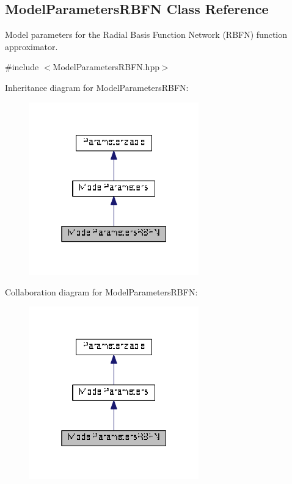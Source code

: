 \hypertarget{classDmpBbo_1_1ModelParametersRBFN}{\subsection{Model\+Parameters\+R\+B\+F\+N Class Reference}
\label{classDmpBbo_1_1ModelParametersRBFN}
}


Model parameters for the Radial Basis Function Network (R\+B\+F\+N) function approximator.  




{\ttfamily \#include $<$Model\+Parameters\+R\+B\+F\+N.\+hpp$>$}



Inheritance diagram for Model\+Parameters\+R\+B\+F\+N\+:
\nopagebreak
\begin{figure}[H]
\begin{center}
\leavevmode
\includegraphics[width=208pt]{classDmpBbo_1_1ModelParametersRBFN__inherit__graph}
\end{center}
\end{figure}


Collaboration diagram for Model\+Parameters\+R\+B\+F\+N\+:
\nopagebreak
\begin{figure}[H]
\begin{center}
\leavevmode
\includegraphics[width=208pt]{classDmpBbo_1_1ModelParametersRBFN__coll__graph}
\end{center}
\end{figure}
